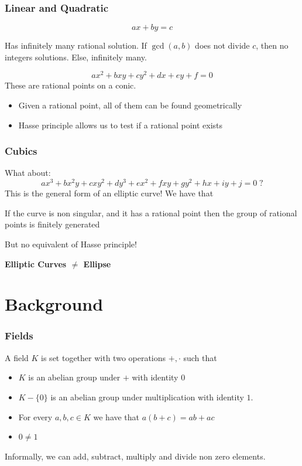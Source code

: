 \documentclass{beamer}
\begin{document}
\begin{frame}
    \frametitle{Linear and Quadratic}
    \[ a x + b y = c \]
    \begin{theorem}
        Has infinitely many rational solution. If $\gcd(a, b)$ does not divide $c$, then no integers solutions.
        Else, infinitely many.
    \end{theorem}
    \[ a x^2 + b x y + c y^2  + d x + e y + f = 0 \]
    These are rational points on a conic. 
    \begin{itemize}
        \item Given a rational point, all of them can be found geometrically
        \item Hasse principle allows us to test if a rational point exists
    \end{itemize}

\end{frame}

\begin{frame}
    \frametitle{Cubics}
    What about:
    \[ a x^3 + b x^2 y + c x y^2 + d y^3 + e x^2 + f x y + g y^2 + h x + i y + j = 0 \; ? \]
    This is the general form of an elliptic curve!
    We have that 
    \begin{theorem}[Mordell]
        If the curve is non singular, and it has a rational point then the group of rational points is finitely generated
    \end{theorem}
    But no equivalent of Hasse principle!

    \begin{center}
        \textbf{Elliptic Curves $\neq$ Ellipse}
    \end{center}
\end{frame}

\section{Background}
\begin{frame}
    \frametitle{Fields}
    \begin{definition}
        A field $K$ is set together with two operations $+, \cdot$ such that 
        \begin{itemize}
            \item $K$ is an abelian group under $+$ with identity $0$
            \item $K - \{ 0 \}$ is an abelian group under multiplication with identity $1$.
            \item For every $a,b,c \in K$ we have that $a (b + c) = ab + ac$
            \item $0 \neq 1$
        \end{itemize}
    \end{definition}
    Informally, we can add, subtract, multiply and divide non zero elements.
\end{frame}
\end{document}
